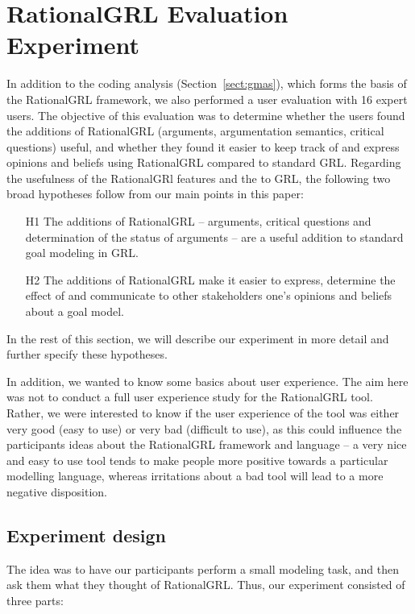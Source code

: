 \section{RationalGRL Evaluation Experiment}
\label{sect:validation}

In addition to the coding analysis (Section~\ref{sect:gmas}), which forms the basis of the RationalGRL framework, we also performed a user evaluation with 16 expert users. The objective of this evaluation was to determine whether the users found the additions of RationalGRL (arguments, argumentation semantics, critical questions) useful, and whether they found it easier to keep track of and express opinions and beliefs using RationalGRL compared to standard GRL. Regarding the usefulness of the RationalGRl features and the to GRL, the following two broad hypotheses follow from our main points in this paper:

\begin{itemize}
\item[H1] The additions of RationalGRL -- arguments, critical questions and determination of the status of arguments -- are a useful addition to standard goal modeling in GRL.
\item[H2] The additions of RationalGRL make it easier to express, determine the effect of and communicate to other stakeholders one's opinions and beliefs about a goal model.
\end{itemize}

In the rest of this section, we will describe our experiment in more detail and further specify these hypotheses.

In addition, we wanted to know some basics about user experience. The aim here was not to conduct a full user experience study for the RationalGRL tool. Rather, we were interested to know if the user experience of the tool was either very good (easy to use) or very bad (difficult to use), as this could influence the participants ideas about the RationalGRL framework and language -- a very nice and easy to use tool tends to make people more positive towards a particular modelling language, whereas irritations about a bad tool will lead to a more negative disposition. 

\subsection{Experiment design}

The idea was to have our participants perform a small modeling task, and then ask them what they thought of RationalGRL. Thus, our experiment consisted of three parts:

